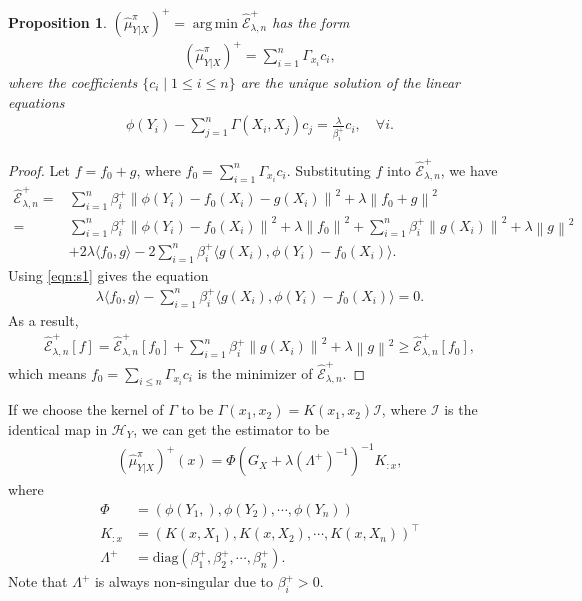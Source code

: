 \documentclass[a4paper]{article}
\newcommand{\up}{\mathrm}
\renewcommand{\cal}{\mathcal}
\newcommand{\norm}[1]{\left\lVert#1\right\rVert}
\newcommand{\T}{\intercal}
\DeclareMathOperator*{\argmin}{arg\,min}
\newtheorem{proposition}{Proposition}
\def\eplus{\widehat{\cal{E}}_{\lambda,n}^+}
\def\muyxplus{(\widehat{\mu}_{Y|X}^\pi)^+}
\begin{document}
\begin{proposition}
$\muyxplus = \argmin \eplus$ has the form
\begin{align}
\muyxplus = \sum_{i=1}^n \Gamma_{x_i}c_i,
\end{align}
where the coefficients $\{c_i\mid 1\leq i\leq n\}$ are the unique solution of the linear equations
\begin{align}
\phi(Y_i) - \sum_{j=1}^n \Gamma(X_i,X_j)c_j = \frac{\lambda}{\beta_i^+} c_i,\quad \forall i.\label{eqn:s1}
\end{align}
\end{proposition}
\begin{proof}
Let $f = f_0 +g$, where $f_0 = \sum_{i=1}^n \Gamma_{x_i}c_i$. Substituting $f$ into $\eplus$, we have
\begin{align}
\eplus =& \sum_{i=1}^n \beta_i^+ \norm{\phi(Y_i) - f_0(X_i) - g(X_i)}^2 + \lambda \norm{f_0+g}^2\\
=& \sum_{i=1}^n\beta_i^+ \norm{\phi(Y_i)-f_0(X_i)}^2 + \lambda\norm{f_0}^2 + \sum_{i=1}^n \beta_i^+ \norm{g(X_i)}^2 + \lambda \norm{g}^2\\
 &+ 2\lambda\langle f_0,g\rangle - 2\sum_{i=1}^n \beta_i^+ \langle g(X_i) ,\phi(Y_i) - f_0(X_i)\rangle.
\end{align}
Using \eqref{eqn:s1} gives the equation
\begin{align}
\lambda\langle f_0,g\rangle - \sum_{i=1}^n \beta_i^+ \langle g(X_i) ,\phi(Y_i) - f_0(X_i)\rangle = 0.
\end{align}
As a result,
\begin{align}
\eplus[f] = \eplus[f_0] + \sum_{i=1}^n \beta_i^+ \norm{g(X_i)}^2 + \lambda \norm{g}^2 \geq \eplus[f_0],
\end{align}
which means $f_0=\sum_{i\leq n}\Gamma_{x_i}c_i$ is the minimizer of $\eplus$.
\end{proof}
If we choose the kernel of $\Gamma$ to be $\Gamma(x_1,x_2) = K(x_1,x_2)\cal{I}$, where $\cal{I}$ is the identical map in $\cal{H}_Y$, we can get the estimator to be
\begin{align}
\boxed{\muyxplus(x) = \Phi(G_X + \lambda(\Lambda^+)^{-1})^{-1}K_{:x}},
\end{align}
where
\begin{align*}
\Phi &= (\phi(Y_1,),\phi(Y_2),\cdots,\phi(Y_n))\\
K_{:x} &= (K(x,X_1),K(x,X_2),\cdots,K(x,X_n))^\T\\
\Lambda^+ &= \up{diag}(\beta_1^+,\beta_2^+,\cdots,\beta_n^+).
\end{align*}
Note that $\Lambda^+$ is always non-singular due to $\beta_i^+ > 0$.
\end{document}
